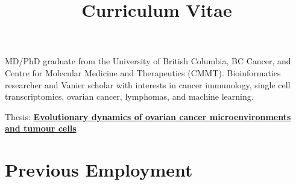 \documentclass[11pt,a4paper,sans]{moderncv}        %
\title{Curriculum Vitae}                               %
\begin{document}
\makecvtitle

\small{MD/PhD graduate from the University of British Columbia, BC Cancer, and Centre for Molecular Medicine and Therapeutics (CMMT). Bioinformatics researcher and Vanier scholar with interests in cancer immunology, single cell transcriptomics, ovarian cancer, lymphomas, and machine learning.}

\vspace{6pt}

\small{Thesis: \href{https://open.library.ubc.ca/cIRcle/collections/ubctheses/24/items/1.0379237}{\textbf{Evolutionary dynamics of ovarian cancer microenvironments and tumour cells}}}

\section{Previous Employment}

\vspace{6pt}
\end{document}
